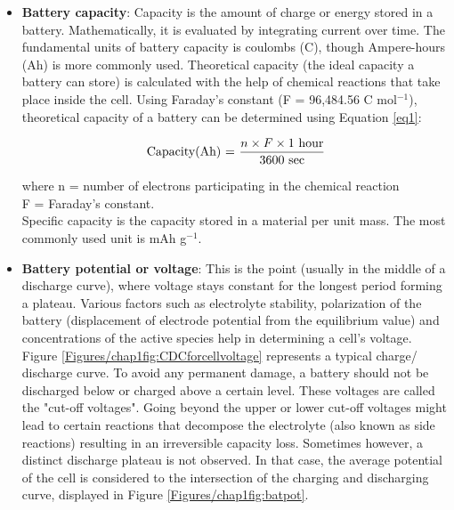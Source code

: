 \begin{itemize}
\item \textbf{Battery capacity}: Capacity is the amount of charge or energy stored in a battery. Mathematically, it is evaluated by integrating current over time. The fundamental units of battery capacity is coulombs (C), though Ampere-hours (Ah) is more commonly used.  Theoretical capacity (the ideal capacity a battery can store) is calculated with the help of chemical reactions that take place inside the cell. Using Faraday's constant (F = 96,484.56 C mol$^{-1}$), theoretical capacity of a battery can be determined using Equation \ref{eq1}:

\begin{equation} \label{eq1}
  \text{Capacity(Ah) = } \frac{n \times F \times 1 \text{ hour}}{3600 \text{ sec}}\\
\end{equation}

where n = number of electrons participating in the chemical reaction \\
F = Faraday's constant. \\ Specific capacity is the capacity stored in a material per unit mass. The most commonly used unit is mAh g$^{-1}$. 
\item \textbf{Battery potential or voltage}: This is the point (usually in the middle of a discharge curve), where voltage stays constant for the longest period forming a plateau. Various factors such as electrolyte stability, polarization of the battery (displacement of electrode potential from the equilibrium value) and concentrations of the active species help in determining a cell's voltage. Figure \ref{Figures/chap1fig:CDCforcellvoltage} represents a typical charge/ discharge curve. To avoid any permanent damage, a battery should not be discharged below or charged above a certain level. These voltages are called the "cut-off voltages". Going beyond the upper or lower cut-off voltages might lead to certain reactions that decompose the electrolyte (also known as side reactions) resulting in an irreversible capacity loss. Sometimes however, a distinct discharge plateau is not observed. In that case, the average potential of the cell is considered to the intersection of the charging and discharging curve, displayed in Figure \ref{Figures/chap1fig:batpot}. 


\end{itemize}
